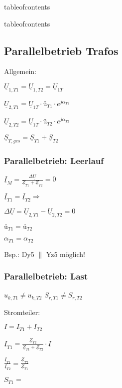 \documentclass[a4paper,11pt]{article}
\begin{document}
	
	tableofcontents
	
	
	tableofcontents

	\subsection{Parallelbetrieb Trafos}
	Allgemein:

	$\underline{U}_{1,T1} = \underline{U}_{1,T2} = \underline{U}_{1T}$

	$\underline{U}_{2,T1} = \underline{U}_{1T} \cdot \text{ü}_{T1} \cdot e^{j\alpha_{T1}}$

	$\underline{U}_{2,T2} = \underline{U}_{1T} \cdot \text{ü}_{T2} \cdot e^{j\alpha_{T2}}$

	$\underline{S}_{T,ges} = \underline{S}_{T1} + \underline{S}_{T2}$

	\subsubsection{Parallelbetrieb: Leerlauf}

	$\underline{I}_M = \frac{\Delta \underline{U}}{\underline{Z}_{T1} + \underline{Z}_{T2}} = 0$

	$\underline{I}_{T1} = \underline{I}_{T2} \Rightarrow$

	$ \Delta \underline{U} = \underline{U}_{2,T1} - \underline{U}_{2,T2} = 0 $ 

	$\text{ü}_{T1} = \text{ü}_{T2}$
	
	$\alpha_{T1} = \alpha_{T2}$
	
	Bsp.: Dy5 $\parallel$ Yz5 möglich!

	\subsubsection{Parallelbetrieb: Last}

	$u_{k,T1} \neq u_{k,T2}$ \quad $S_{r,T1} \neq S_{r,T2}$
	
	Stromteiler: 

	$I = I_{T1} + I_{T2}$

	$\underline{I}_{T1} = \frac{\underline{Z}_{T2}}{\underline{Z}_{T1}+\underline{Z}_{T2}}\cdot \underline{I}$

	$\frac{\underline{I}_{T1}}{\underline{I}_{T2}} = \frac{\underline{Z}_{T2}}{\underline{Z}_{T1}}$

	$S_{T1} = $
	



	
\end{document}
